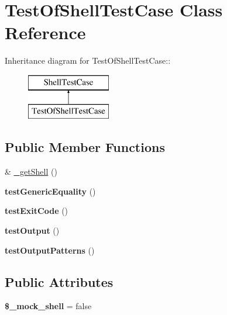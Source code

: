 \hypertarget{class_test_of_shell_test_case}{
\section{TestOfShellTestCase Class Reference}
\label{class_test_of_shell_test_case}
}
Inheritance diagram for TestOfShellTestCase::\begin{figure}[H]
\begin{center}
\leavevmode
\includegraphics[height=2cm]{class_test_of_shell_test_case}
\end{center}
\end{figure}
\subsection*{Public Member Functions}
\begin{DoxyCompactItemize}
\item 
\& \hyperlink{class_test_of_shell_test_case_af3aa12f7445154b54aaa645ca973acac}{\_\-getShell} ()
\item 
\hypertarget{class_test_of_shell_test_case_ab7b38e4557da6d48e80097aecf994d74}{
{\bfseries testGenericEquality} ()}
\label{class_test_of_shell_test_case_ab7b38e4557da6d48e80097aecf994d74}

\item 
\hypertarget{class_test_of_shell_test_case_a722041d0fb3dda107d29041fe7e8c175}{
{\bfseries testExitCode} ()}
\label{class_test_of_shell_test_case_a722041d0fb3dda107d29041fe7e8c175}

\item 
\hypertarget{class_test_of_shell_test_case_aeab8e10eba9e0eefbc8d1451420d78f9}{
{\bfseries testOutput} ()}
\label{class_test_of_shell_test_case_aeab8e10eba9e0eefbc8d1451420d78f9}

\item 
\hypertarget{class_test_of_shell_test_case_a5749c45233c4fd4812193b822ba43286}{
{\bfseries testOutputPatterns} ()}
\label{class_test_of_shell_test_case_a5749c45233c4fd4812193b822ba43286}

\end{DoxyCompactItemize}
\subsection*{Public Attributes}
\begin{DoxyCompactItemize}
\item 
\hypertarget{class_test_of_shell_test_case_abf442ccfe39a468d3b5818a6cfd1cbf3}{
{\bfseries \$\_\-mock\_\-shell} = false}
\label{class_test_of_shell_test_case_abf442ccfe39a468d3b5818a6cfd1cbf3}

\end{DoxyCompactItemize}



